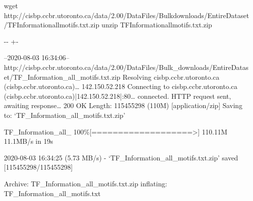\documentclass[letterpaper,10pt,english]{sphinxmanual}
\newlength\nbsphinxcodecellspacing
\begin{document}
{
\begin{sphinxVerbatim}[commandchars=\\\{\}]
\llap{\color{nbsphinxin}[3]:\,\hspace{\fboxrule}\hspace{\fboxsep}}wget http://cisbp.ccbr.utoronto.ca/data/2.00/DataFiles/Bulk\PYGZus{}downloads/EntireDataset/TF\PYGZus{}Information\PYGZus{}all\PYGZus{}motifs.txt.zip
 unzip TF\PYGZus{}Information\PYGZus{}all\PYGZus{}motifs.txt.zip
\end{sphinxVerbatim}
}

{

\kern-\sphinxverbatimsmallskipamount\kern-\baselineskip
\kern+\FrameHeightAdjust\kern-\fboxrule
\vspace{\nbsphinxcodecellspacing}

\begin{sphinxVerbatim}[commandchars=\\\{\}]
--2020-08-03 16:34:06--  http://cisbp.ccbr.utoronto.ca/data/2.00/DataFiles/Bulk\_downloads/EntireDataset/TF\_Information\_all\_motifs.txt.zip
Resolving cisbp.ccbr.utoronto.ca (cisbp.ccbr.utoronto.ca){\ldots} 142.150.52.218
Connecting to cisbp.ccbr.utoronto.ca (cisbp.ccbr.utoronto.ca)|142.150.52.218|:80{\ldots} connected.
HTTP request sent, awaiting response{\ldots} 200 OK
Length: 115455298 (110M) [application/zip]
Saving to: ‘TF\_Information\_all\_motifs.txt.zip’

TF\_Information\_all\_ 100\%[===================>] 110.11M  11.1MB/s    in 19s

2020-08-03 16:34:25 (5.73 MB/s) - ‘TF\_Information\_all\_motifs.txt.zip’ saved [115455298/115455298]

Archive:  TF\_Information\_all\_motifs.txt.zip
  inflating: TF\_Information\_all\_motifs.txt
\end{sphinxVerbatim}
}

{
\begin{sphinxVerbatim}[commandchars=\\\{\}]
\llap{\color{nbsphinxin}[4]:\,\hspace{\fboxrule}\hspace{\fboxsep}}
  
\end{sphinxVerbatim}
}
\end{document}
